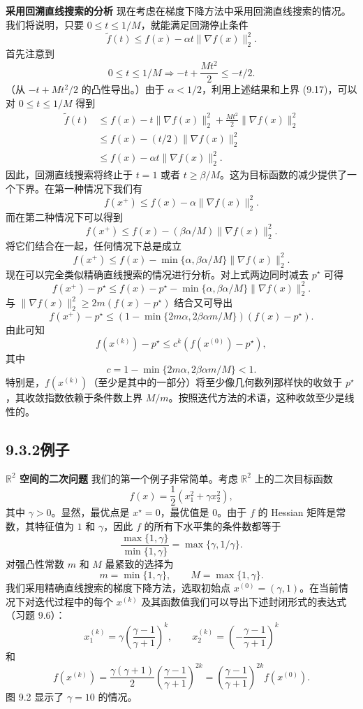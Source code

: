 \documentclass[UTF8,12pt,a4paper,fontset=fandol]{ctexart}
\begin{document}
\noindent\textbf{采用回溯直线搜索的分析}\quad
现在考虑在梯度下降方法中采用回溯直线搜索的情况。我们将说明，只要 $0\leq t\leq 1/M$，就能满足回溯停止条件
\[
\tilde{f}(t)\leq f(x)-\alpha t\|\nabla f(x)\|_2^2.
\]
首先注意到
\[
0\leq t\leq 1/M\Longrightarrow -t+\frac{Mt^2}{2}\leq -t/2.
\]
（从 $-t+Mt^2/2$ 的凸性导出。）由于 $\alpha<1/2$，利用上述结果和上界 (9.17)，可以对 $0\leq t\leq1/M$ 得到
\[
\begin{aligned}
\tilde{f}(t)
&\leq f(x)-t\|\nabla f(x)\|_2^2+\frac{Mt^2}{2}\|\nabla f(x)\|_2^2\\
&\leq f(x)-(t/2)\|\nabla f(x)\|_2^2\\
&\leq f(x)-\alpha t\|\nabla f(x)\|_2^2.
\end{aligned}
\]
因此，回溯直线搜索将终止于 $t=1$ 或者 $t\geq \beta/M$。这为目标函数的减少提供了一个下界。在第一种情况下我们有
\[
f(x^+)\leq f(x)-\alpha\|\nabla f(x)\|_2^2.
\]
而在第二种情况下可以得到
\[
f(x^+)\leq f(x)-(\beta\alpha/M)\|\nabla f(x)\|_2^2.
\]
将它们结合在一起，任何情况下总是成立
\[
f(x^+)\leq f(x)-\min\{\alpha,\beta\alpha/M\}\|\nabla f(x)\|_2^2.
\]
现在可以完全类似精确直线搜索的情况进行分析。对上式两边同时减去 $p^\star$ 可得
\[
f(x^+)-p^\star\leq f(x)-p^\star-\min\{\alpha,\beta\alpha/M\}\|\nabla f(x)\|_2^2.
\]
与 $\|\nabla f(x)\|_2^2\geq 2m(f(x)-p^\star)$ 结合又可导出
\[
f(x^+)-p^\star\leq (1-\min\{2m\alpha,2\beta\alpha m/M\})(f(x)-p^\star).
\]
由此可知
\[
f(x^{(k)})-p^\star\leq c^k(f(x^{(0)})-p^\star),
\]
其中
\[
c=1-\min\{2m\alpha,2\beta\alpha m/M\}<1.
\]
特别是，$f(x^{(k)})$（至少是其中的一部分）将至少像几何数列那样快的收敛于 $p^\star$，其收敛指数依赖于条件数上界 $M/m$。按照迭代方法的术语，这种收敛至少是线性的。

\subsection*{9.3.2\quad 例子}

\noindent\textbf{$\mathbb{R}^2$ 空间的二次问题}\quad
我们的第一个例子非常简单。考虑 $\mathbb{R}^2$ 上的二次目标函数
\[
f(x)=\frac{1}{2}(x_1^2+\gamma x_2^2),
\]
其中 $\gamma>0$。显然，最优点是 $x^\star=0$，最优值是 $0$。由于 $f$ 的 Hessian 矩阵是常数，其特征值为 $1$ 和 $\gamma$，因此 $f$ 的所有下水平集的条件数都等于
\[
\frac{\max\{1,\gamma\}}{\min\{1,\gamma\}}=\max\{\gamma,1/\gamma\}.
\]
对强凸性常数 $m$ 和 $M$ 最紧致的选择为
\[
m=\min\{1,\gamma\},\qquad M=\max\{1,\gamma\}.
\]
我们采用精确直线搜索的梯度下降方法，选取初始点 $x^{(0)}=(\gamma,1)$。在当前情况下对迭代过程中的每个 $x^{(k)}$ 及其函数值我们可以导出下述封闭形式的表达式（习题 9.6）：
\[
x_1^{(k)}=\gamma\left(\frac{\gamma-1}{\gamma+1}\right)^k,\qquad
x_2^{(k)}=\left(-\frac{\gamma-1}{\gamma+1}\right)^k
\]
和
\[
f(x^{(k)})=\frac{\gamma(\gamma+1)}{2}\left(\frac{\gamma-1}{\gamma+1}\right)^{2k}
=\left(\frac{\gamma-1}{\gamma+1}\right)^{2k}f(x^{(0)}).
\]
图 9.2 显示了 $\gamma=10$ 的情况。
\end{document}
